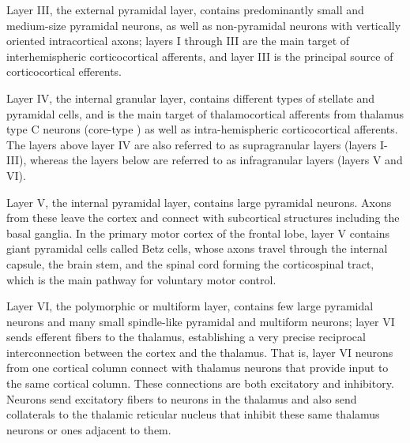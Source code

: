 Layer III, the external pyramidal layer, contains predominantly small and medium-size pyramidal neurons, as well as non-pyramidal neurons with vertically oriented intracortical axons; layers I through III are the main target of interhemispheric corticocortical afferents, and layer III is the principal source of corticocortical efferents.

Layer IV, the internal granular layer, contains different types of stellate and pyramidal cells, and is the main target of thalamocortical afferents from thalamus type C neurons (core-type ) as well as intra-hemispheric corticocortical afferents. The layers above layer IV are also referred to as supragranular layers (layers I-III), whereas the layers below are referred to as infragranular layers (layers V and VI).

Layer V, the internal pyramidal layer, contains large pyramidal neurons. Axons from these leave the cortex and connect with subcortical structures including the basal ganglia. In the primary motor cortex of the frontal lobe, layer V contains giant pyramidal cells called Betz cells, whose axons travel through the internal capsule, the brain stem, and the spinal cord forming the corticospinal tract, which is the main pathway for voluntary motor control.

Layer VI, the polymorphic or multiform layer, contains few large pyramidal neurons and many small spindle-like pyramidal and multiform neurons; layer VI sends efferent fibers to the thalamus, establishing a very precise reciprocal interconnection between the cortex and the thalamus. That is, layer VI neurons from one cortical column connect with thalamus neurons that provide input to the same cortical column. These connections are both excitatory and inhibitory. Neurons send excitatory fibers to neurons in the thalamus and also send collaterals to the thalamic reticular nucleus that inhibit these same thalamus neurons or ones adjacent to them.



